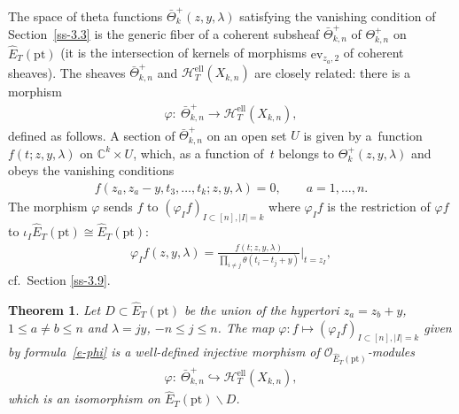 \documentclass[10pt,a4paper]{amsart}
\numberwithin{equation}{section}
\newtheorem{Theorem}{Theorem}[section]
\begin{document}
The space of theta functions $\bar\Theta^+_k(z,y,\lambda)$ satisfying the vanishing condition of Section~\ref{ss-3.3} is the generic fiber of a coherent subsheaf $\bar\Theta^+_{k,n}$ of $\Theta^+_{k,n}$ on $\hat E_T(\mathrm{pt})$ (it is the intersection of kernels of morphisms $\mathrm{ev}_{z_a,2}$ of coherent sheaves). The sheaves $\bar\Theta^+_{k,n}$ and $\mathcal H_T^{\mathrm{ell}}(X_{k,n})$ are closely related: there is a morphism
\begin{gather*}
 \varphi\colon \ \bar\Theta^+_{k,n}\to \mathcal H_T^{\mathrm{ell}}(X_{k,n}),
\end{gather*}
defined as follows. A section of $\bar\Theta^+_{k,n}$ on an open set $U$ is given by a~function $f(t;z,y,\lambda)$ on $\mathbb C^k\times U$, which, as a function of~$t$ belongs to $\Theta^+_k(z,y,\lambda)$ and obeys the vanishing conditions
\begin{gather*}
 f(z_a,z_a-y,t_3,\dots,t_k;z,y,\lambda)=0, \qquad a=1,\dots,n.
\end{gather*}
The morphism $\varphi$ sends $f$ to $(\varphi_If)_{I\subset [n],|I|=k}$ where $\varphi_If$ is the restriction of $\varphi f$ to $\iota_I \hat E_T(\mathrm{pt})\cong\hat E_T(\mathrm{pt})$:
\begin{gather}\label{e-phi}
 \varphi_If(z,y,\lambda)= \frac{f(t;z,y,\lambda)}{\prod\limits_{i\neq j} \theta(t_i-t_j+y)}\bigg|_{t=z_I},
\end{gather}
cf.~Section \ref{ss-3.9}.

\begin{Theorem}\label{th-0} Let $D\subset \hat E_T(\mathrm{pt})$ be the union of the hypertori $z_a=z_b+y$, $1\leq a\neq b\leq n$ and $\lambda=jy$, $-n\leq j\leq n$. The map $\varphi\colon f\mapsto (\varphi_If)_{I\subset [n], |I|=k}$ given by formula~\eqref{e-phi} is a well-defined injective morphism of $\mathcal O_{\hat E_{T}(\mathrm{pt})}$-modules
 \begin{gather*}
 \varphi\colon \ \bar\Theta^+_{k,n}\hookrightarrow \mathcal H^{\mathrm{ell}}_T(X_{k,n}),
 \end{gather*}
 which is an isomorphism on $\hat E_T(\mathrm{pt})\smallsetminus D$.
\end{Theorem}
\end{document}
